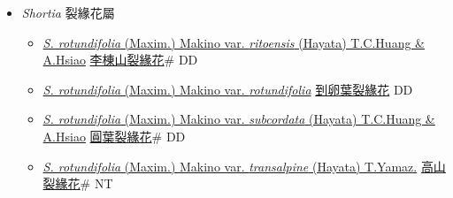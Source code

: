 
  \begin{itemize}
 \item[] \textit{Shortia} 裂緣花屬
                    
  \begin{itemize}
        \item[] \href{http://www.theplantlist.org/tpl1.1/search?q=Shortia+rotundifolia+var.+ritoensis}{\textit{S. rotundifolia} (Maxim.) Makino var. \textit{ritoensis} (Hayata) T.C.Huang \& A.Hsiao}   \href{\detokenize{http://taibnet.sinica.edu.tw/chi/taibnet_species_list.php?T2=李棟山裂緣花&T2_new_value=true&fr=y}}{李棟山裂緣花}\# DD
        \item[] \href{http://www.theplantlist.org/tpl1.1/search?q=Shortia+rotundifolia+var.+rotundifolia}{\textit{S. rotundifolia} (Maxim.) Makino var. \textit{rotundifolia}}   \href{\detokenize{http://taibnet.sinica.edu.tw/chi/taibnet_species_list.php?T2=到卵葉裂緣花&T2_new_value=true&fr=y}}{到卵葉裂緣花} DD
        \item[] \href{http://www.theplantlist.org/tpl1.1/search?q=Shortia+rotundifolia+var.+subcordata}{\textit{S. rotundifolia} (Maxim.) Makino var. \textit{subcordata} (Hayata) T.C.Huang \& A.Hsiao}   \href{\detokenize{http://taibnet.sinica.edu.tw/chi/taibnet_species_list.php?T2=圓葉裂緣花&T2_new_value=true&fr=y}}{圓葉裂緣花}\# DD
        \item[] \href{http://www.theplantlist.org/tpl1.1/search?q=Shortia+rotundifolia+var.+transalpine}{\textit{S. rotundifolia} (Maxim.) Makino var. \textit{transalpine} (Hayata) T.Yamaz.}   \href{\detokenize{http://taibnet.sinica.edu.tw/chi/taibnet_species_list.php?T2=高山裂緣花&T2_new_value=true&fr=y}}{高山裂緣花}\# NT
  \end{itemize}
  \end{itemize}

